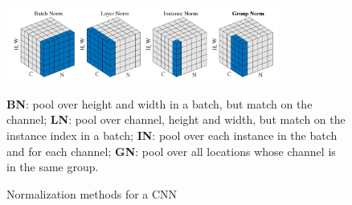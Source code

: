\begin{figure}[htpb]
    \centering
    \includegraphics[width=0.8\textwidth]{figs/cnnnormlayer.png}
    \caption{Normalization methods for a CNN}
    {\footnotesize
    \textbf{BN}: pool over height and width in a batch, but match on the channel;
    \textbf{LN}: pool over channel, height and width, but match on the instance index in a batch;
    \textbf{IN}: pool over each instance in the batch and for each channel;
    \textbf{GN}: pool over all locations whose channel is in the same group.
    }
    \label{fig:cnnnormlayer}
\end{figure}